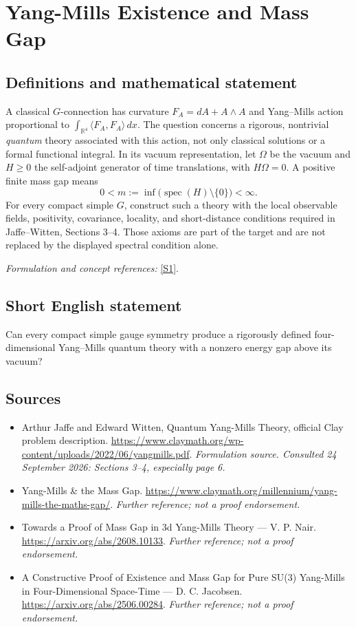 \documentclass[11pt]{article}
\begin{document}
\section*{\texorpdfstring{Yang-Mills Existence and Mass Gap}{Yang-Mills Existence and Mass Gap}}\label{3}
\subsection{Definitions and mathematical statement}
A classical $G$-connection has curvature $F_A=dA+A\wedge A$ and Yang--Mills action proportional to $\int_{{\mathbb{R}}^4}\langle F_A,F_A\rangle\,dx$. The question concerns a rigorous, nontrivial \emph{quantum} theory associated with this action, not only classical solutions or a formal functional integral. In its vacuum representation, let $\Omega$ be the vacuum and $H\ge0$ the self-adjoint generator of time translations, with $H\Omega=0$. A positive finite mass gap means
\[
 0<m:=\inf\bigl(\operatorname{spec}(H)\setminus\{0\}\bigr)<\infty.
\]
For every compact simple $G$, construct such a theory with the local observable fields, positivity, covariance, locality, and short-distance conditions required in Jaffe--Witten, Sections 3--4. Those axioms are part of the target and are not replaced by the displayed spectral condition alone.
\par\smallskip\textit{Formulation and concept references:} \href{https://www.claymath.org/wp-content/uploads/2022/06/yangmills.pdf}{[S1]}.

\subsection{Short English statement}
Can every compact simple gauge symmetry produce a rigorously defined four-dimensional Yang--Mills quantum theory with a nonzero energy gap above its vacuum?
\subsection{Sources}
\begin{itemize}
\item[S1]Arthur Jaffe and Edward Witten, Quantum Yang-Mills Theory, official Clay problem description.
\url{https://www.claymath.org/wp-content/uploads/2022/06/yangmills.pdf}.
\textit{Formulation source. Consulted 24 September 2026: Sections 3--4, especially page 6.}
\item[S2]Yang-Mills \& the Mass Gap.
\url{https://www.claymath.org/millennium/yang-mills-the-maths-gap/}.
\textit{Further reference; not a proof endorsement.}
\item[S3]Towards a Proof of Mass Gap in 3d Yang-Mills Theory — V. P. Nair.
\url{https://arxiv.org/abs/2608.10133}.
\textit{Further reference; not a proof endorsement.}
\item[S4]A Constructive Proof of Existence and Mass Gap for Pure SU(3) Yang-Mills in Four-Dimensional Space-Time — D. C. Jacobsen.
\url{https://arxiv.org/abs/2506.00284}.
\textit{Further reference; not a proof endorsement.}
\end{itemize}
\end{document}
